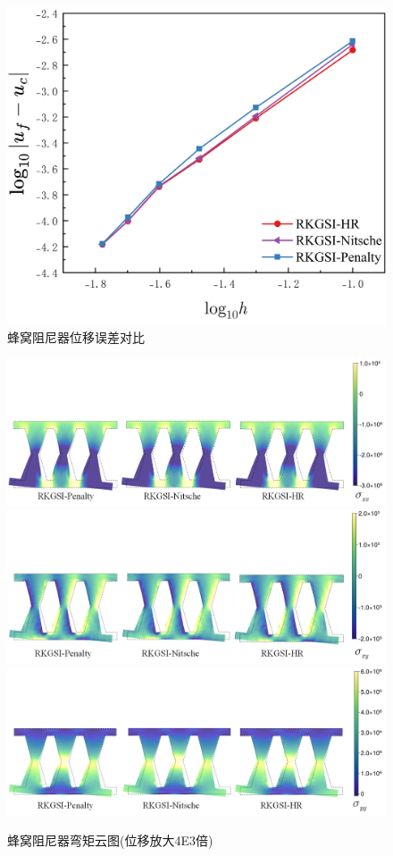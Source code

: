 \begin{figure}[H]
    \centering
    \includegraphics[scale=0.5]{figure/DAMPER/Honeycomb/honeycomb_damperx.png}
    \caption{蜂窝阻尼器位移误差对比}\label{honeycomb_damperx}
\end{figure}
\begin{figure}[H]
    \centering
        \includegraphics[scale=0.5]{figure/DAMPER/Honeycomb/M11.png}
        \includegraphics[scale=0.5]{figure/DAMPER/Honeycomb/M12.png}
        \includegraphics[scale=0.5]{figure/DAMPER/Honeycomb/M22.png}
    \caption{蜂窝阻尼器弯矩云图(位移放大4E3倍)}\label{HoneycombM}
\end{figure}
